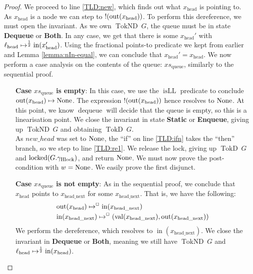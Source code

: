 \documentclass[a4paper, 10pt]{report}
\theoremstyle{definition}
\newcommand{\locked}{\operatorname{locked}}
\newcommand{\dequeue}{\operatorname{dequeue}}
\newcommand{\xsqueue}{xs_{\mathrm{queue}}}
\newcommand{\isLL}{\operatorname{isLL}}
\newcommand{\locN}[1]{\loc_{\mathrm{#1}}}
\newcommand{\lochead}{\locN{head}}
\newcommand{\nodeval}{\valB}
\newcommand{\nIn}[1]{\operatorname{in}(#1)}
\newcommand{\nVal}[1]{\operatorname{val}(#1)}
\newcommand{\nOut}[1]{\operatorname{out}(#1)}
\newcommand{\node}{x}
\newcommand{\nodeN}[1]{\node_{\mathrm{#1}}}
\newcommand{\nodehead}{\nodeN{head}}
\newcommand{\nodeheadnext}{\nodeN{head\_next}}
\newcommand{\StaticState}{\textbf{Static}\xspace}
\newcommand{\EnqueueState}{\textbf{Enqueue}\xspace}
\newcommand{\DequeueState}{\textbf{Dequeue}\xspace}
\newcommand{\BothState}{\textbf{Both}\xspace}
\newcommand{\Qg}{G}
\newcommand{\ghlock}{\gname_{\mathrm{Hlock}}}
\newcommand{\TokD}[1]{\operatorname{TokD} ~ #1}
\newcommand{\TokDQg}{\TokD{\Qg}}
\newcommand{\TokND}[1]{\operatorname{TokND} ~ #1}
\newcommand{\TokNDQg}{\TokND{\Qg}}
\newcommand{\isNode}[1]{\nIn{#1} \mapsto^{\persistently} (\nVal{#1}, \nOut{#1})}
\begin{document}
\begin{proof}
We proceed to line \ref{TLD:new}, which finds out what $\nodehead$ is pointing to. As $\nodehead$ is a node we can step to $\deref (\nOut{\nodehead})$. To perform this dereference, we must open the invariant. As we own $\TokNDQg$, the queue must be in state \DequeueState or \BothState. In any case, we get that there is some $\nodehead'$ with $\lochead \mapsto^{\frac{1}{2}} \nIn{\nodehead'}$. Using the fractional points-to predicate we kept from earlier and Lemma \ref{lemma:nIn-equal}, we can conclude that $\nodehead' = \nodehead$. We now perform a case analysis on the contents of the queue: $\xsqueue$, similarly to the sequential proof.
\begin{itemize}
  \item[\textbf{Case}] \textbf{$\xsqueue$ is empty}:
  In this case, we use the $\isLL$ predicate to conclude $\nOut{\nodehead} \mapsto \None$. The expression $\deref (\nOut{\nodehead})$ hence resolves to $\operatorname{None}$. At this point, we know $\dequeue$ will decide that the queue is empty, so this is a linearisation point. We close the invariant in state \StaticState or \EnqueueState, giving up $\TokNDQg$ and obtaining $\TokDQg$.\\
  As $new\_head$ was set to $\operatorname{None}$, the ``if'' on line \ref{TLD:ifn} takes the ``then'' branch, so we step to line \ref{TLD:re1}. We release the lock, giving up $\TokDQg$ and $\locked(\Qg.\ghlock)$, and return $\operatorname{None}$. We must now prove the post-condition with $\nodeval = \None$. We easily prove the first disjunct.

  \item[\textbf{Case}] \textbf{$\xsqueue$ is not empty}:
  As in the sequential proof, we conclude that $\nodehead$ points to $\nodeheadnext$ for some $\nodeheadnext$. That is, we have the following:
  \begin{align}
    &\nOut{\nodehead} \mapsto^{\persistently} \nIn{\nodeheadnext}\label{TLMSQ:spec:conc:proof:deq:headtonext}\\
    &\isNode{\nodeheadnext}\label{TLMSQ:spec:conc:proof:deq:headnextnode}
  \end{align}
  We perform the dereference, which resolves to $\nIn{\nodeheadnext}$. We close the invariant in \DequeueState or \BothState, meaning we still have $\TokNDQg$ and $\lochead \mapsto^{\frac{1}{2}} \nIn{\nodehead}$.


\end{itemize}
\end{proof}
\end{document}
